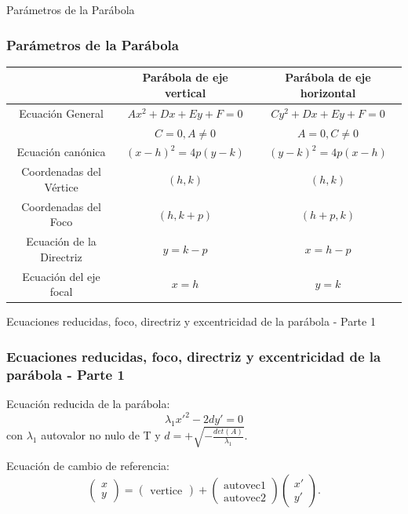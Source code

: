 \documentclass[xcolor={dvipsnames},aspectratio=169,10pt]{beamer}
\begin{document}
\begin{frame}{Parámetros de la Parábola}
  \frametitle{Parámetros de la Parábola}

  \begin{table}[]
    \begin{tabular}{|c|c|c|}
    \hline
    & Parábola de eje vertical & Parábola de eje horizontal \\ \hline
    Ecuación General & $Ax^2 + Dx + Ey + F = 0$ & $Cy^2 + Dx + Ey + F = 0$ \\ 
    & $C = 0, A\neq0$ & $A = 0, C\neq 0$ \\ \hline
    Ecuación canónica & $(x-h)^2 = 4p(y-k)$ & $(y-k)^2 = 4p(x-h)$ \\ \hline
    Coordenadas del Vértice & $(h, k)$ & $(h, k)$ \\ \hline
    Coordenadas del Foco & $(h, k+p)$ & $(h+p, k)$ \\ \hline
    Ecuación de la Directriz & $y=k-p$ & $x=h-p$ \\ \hline
    Ecuación del eje focal & $x=h$ & $y=k$ \\ \hline
    \end{tabular}
  \end{table}
\end{frame}

\begin{frame}{Ecuaciones reducidas, foco, directriz y excentricidad de la parábola - Parte 1}
  \frametitle{Ecuaciones reducidas, foco, directriz y excentricidad de la parábola - Parte 1}
    Ecuación reducida de la parábola:
    \[\lambda_1x'^2 - 2dy' = 0\]
    con $\lambda_1$ autovalor no nulo de T y $d = +\sqrt{-\frac{det(A)}{\lambda_1}}$.
    
    Ecuación de cambio de referencia:
    \[\begin{pmatrix} x \\ y \end{pmatrix} = \begin{pmatrix} \text{vertice} \end{pmatrix} + \begin{pmatrix} \text{autovec1} \\ \text{autovec2} \end{pmatrix} \begin{pmatrix} x' \\ y' \end{pmatrix}.\]
  \end{frame}
\end{document}
